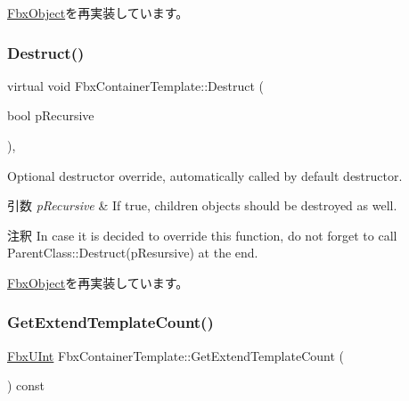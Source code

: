 \hyperlink{class_fbx_object_ad44f814323dc1b5e78bff1bfc608b4bb}{Fbx\+Object}を再実装しています。

\mbox{\label{class_fbx_container_template_a0a99e57b3db934418c1a45b0a35055d7}} 
\subsubsection{\texorpdfstring{Destruct()}{Destruct()}}
{\footnotesize\ttfamily virtual void Fbx\+Container\+Template\+::\+Destruct (\begin{DoxyParamCaption}\item[{bool}]{p\+Recursive }\end{DoxyParamCaption})\hspace{0.3cm}{\ttfamily [protected]}, {\ttfamily [virtual]}}

Optional destructor override, automatically called by default destructor. 
\begin{DoxyParams}{引数}
{\em p\+Recursive} & If true, children objects should be destroyed as well. \\
\hline
\end{DoxyParams}
\begin{DoxyRemark}{注釈}
In case it is decided to override this function, do not forget to call Parent\+Class\+::\+Destruct(p\+Resursive) at the end. 
\end{DoxyRemark}


\hyperlink{class_fbx_object_a123e084d9b32b29c28af6384b7c3c608}{Fbx\+Object}を再実装しています。

\mbox{\label{class_fbx_container_template_a552b2b289ce6ec39e031a0032234cac4}} 
\subsubsection{\texorpdfstring{Get\+Extend\+Template\+Count()}{GetExtendTemplateCount()}}
{\footnotesize\ttfamily \hyperlink{fbxtypes_8h_ae9fb141d8158a730aa85ec5ff2ea3f6b}{Fbx\+U\+Int} Fbx\+Container\+Template\+::\+Get\+Extend\+Template\+Count (\begin{DoxyParamCaption}{ }\end{DoxyParamCaption}) const}

